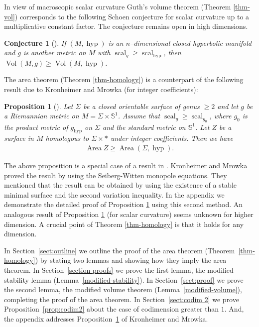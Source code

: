 \documentclass[12pt]{amsart}
\makeatletter
\newtheorem*{rep@theorem}{{Lemma} \ref##}
\newtheorem{prop}[dfn]{Proposition}
	{\newenvironment{rep{prop}}[1]{ } \begin{rep@theorem}} \end{rep@theorem}}
\newtheorem{conj}[dfn]{Conjecture}
\numberwithin{equation}{section}
\makeatother
\begin{document}
 In view of macroscopic scalar curvature Guth's volume theorem (Theorem \ref{thm-vol}) corresponds to the
 following Schoen conjecture for
 scalar curvature up to a multiplicative constant factor.  The conjecture remains open in high dimensions.
 \begin{conj}[{\cite{Schoen89}}]If $(M,\operatorname{hyp})$ is an $n$--dimensional
  closed hyperbolic manifold and $g$ is another metric on $M$ with
  ${\mathop{\mathrm{scal}} \nolimits}_g\geq {\mathop{\mathrm{scal}} \nolimits}_\operatorname{hyp}$, then $\operatorname{Vol} (M,g)\geq \operatorname{Vol} (M,\operatorname{hyp})$.
  \end{conj}

 The area theorem (Theorem \ref{thm-homology}) is a counterpart of the following result due to
 Kronheimer and Mrowka (for integer coefficients): 
\begin{prop}[{\cite{Kronheimer97}}]\label{thm-KM}Let $\Sigma$ be a
 closed orientable surface of genus $\geq 2$ and let $g$ be a Riemannian
 metric on $M = \Sigma \times \mathbb{S}^1$. Assume that ${\mathop{\mathrm{scal}} \nolimits}_g\geq
 {\mathop{\mathrm{scal}} \nolimits}_{g_0}$, where $g_0$ is the product metric of $g_\operatorname{hyp}$ on $\Sigma$ and the
 standard metric on $\mathbb{S}^1$. Let $Z$ be a surface in $M$ homologous to $\Sigma \times \ast$ under integer coefficients.  Then we have
 \begin{align*}
  \operatorname{Area} Z \geq  \operatorname{Area}(\Sigma,\operatorname{hyp}).
  \end{align*}
 \end{prop}
The above proposition is a special case of a result in
\cite[Section 3]{Kronheimer97}. Kronheimer and Mrowka proved the result
by using the Seiberg-Witten monopole equations. They mentioned that the
result can be obtained by using the existence of a stable minimal
surface and the second variation inequality. In the appendix we demonstrate
the detailed proof of Proposition \ref{thm-KM} using this second method. An
analogous result of Proposition \ref{thm-KM} (for scalar curvature) seems unknown for higher
dimension. A crucial point of Theorem \ref{thm-homology} is that it holds
for any dimension. 

In Section~\ref{sect:outline} we outline the proof of the area theorem (Theorem~\ref{thm-homology}) by stating two lemmas and showing how they imply the area theorem.  In Section~\ref{section-proofs} we prove the first lemma, the modified stability lemma (Lemma~\ref{modified-stability}).  In Section~\ref{sect:proof} we prove the second lemma, the modified volume theorem (Lemma~\ref{modified-volume}), completing the proof of the area theorem.  In Section~\ref{sect:codim 2} we prove Proposition~\ref{prop:codim2} about the case of codimension greater than $1$.  And, the appendix addresses Proposition~\ref{thm-KM} of Kronheimer and Mrowka.
\end{document}
